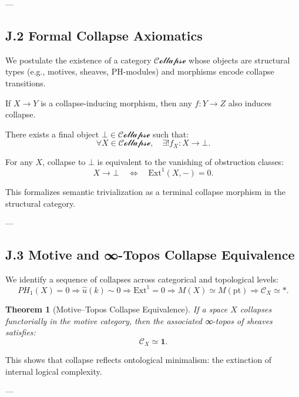 \documentclass[11pt]{article}
\newtheorem{theorem}{Theorem}[section]
\begin{document}
---

\subsection*{J.2 Formal Collapse Axiomatics}

We postulate the existence of a category $\mathcal{Collapse}$ whose objects are structural types (e.g., motives, sheaves, PH-modules)  
and morphisms encode collapse transitions.

\begin{axiom}
If $X \rightarrow Y$ is a collapse-inducing morphism, then any $f: Y \rightarrow Z$ also induces collapse.

\begin{axiom}
There exists a final object $\bot \in \mathcal{Collapse}$ such that:
\[
\forall X \in \mathcal{Collapse},\quad \exists! f_X: X \rightarrow \bot.
\]

\begin{axiom}
For any $X$, collapse to $\bot$ is equivalent to the vanishing of obstruction classes:
\[
X \rightarrow \bot \quad \Longleftrightarrow \quad \mathrm{Ext}^1(X, -) = 0.
\]
\end{axiom}

This formalizes semantic trivialization as a terminal collapse morphism in the structural category.

---

\subsection*{J.3 Motive and ∞-Topos Collapse Equivalence}

We identify a sequence of collapses across categorical and topological levels:
\[
PH_1(X) = 0 \Rightarrow \widehat{u}(k) \sim 0 \Rightarrow \mathrm{Ext}^1 = 0 \Rightarrow M(X) \simeq M(\mathrm{pt}) \Rightarrow \mathcal{C}_X \simeq \ast.
\]

\begin{theorem}[Motive–Topos Collapse Equivalence]
If a space $X$ collapses functorially in the motive category,  
then the associated ∞-topos of sheaves satisfies:
\[
\mathcal{C}_X \simeq \mathbf{1}.
\]
\end{theorem}

This shows that collapse reflects ontological minimalism: the extinction of internal logical complexity.

---


\end{axiom}
\end{axiom}
\end{document}
